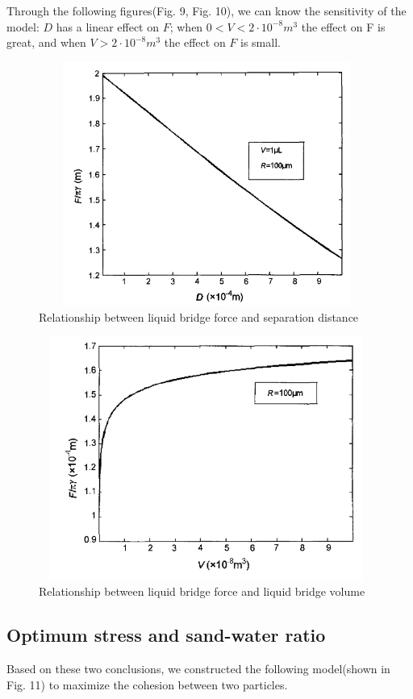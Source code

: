 \documentclass[13pt]{ctexart}
\begin{document}
	Through the following figures(Fig. 9, Fig. 10), we can know the sensitivity of the model: $D $ has a linear effect on $F$; when $ 0 <V <2 \cdot 10^{-8}m ^ 3$ the effect on F is great, and when $V> 2 \cdot 10 ^ {-8}  m ^ 3$ the effect on $F$ is small.
	
	
	\begin{figure}[htb]
		\centering %
		\includegraphics[width=11cm,height=8cm]{bridgeFAD.png}
		\caption{Relationship between liquid bridge force and separation distance}
	\end{figure}
	
	
	\begin{figure}[htb]
		\centering %
		\includegraphics[width=11cm,height=8cm]{bridgeFAV.png}
		\caption{Relationship between liquid bridge force and liquid bridge volume}
	\end{figure}
	
	\subsection{Optimum stress and sand-water ratio}
	Based on these two conclusions, we constructed the following model(shown in Fig. 11) to maximize the cohesion between two particles.
	
\end{document}
